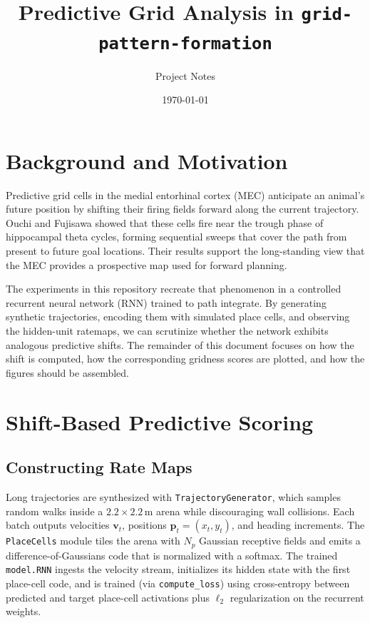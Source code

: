 \documentclass[11pt]{article}
\title{Predictive Grid Analysis in \texttt{grid-pattern-formation}}
\author{Project Notes}
\date{\today}
\begin{document}
\maketitle

\section{Background and Motivation}
Predictive grid cells in the medial entorhinal cortex (MEC) anticipate an animal's future position by shifting their firing fields forward along the current trajectory. Ouchi and Fujisawa \cite{Ouchi2024} showed that these cells fire near the trough phase of hippocampal theta cycles, forming sequential sweeps that cover the path from present to future goal locations. Their results support the long-standing view that the MEC provides a prospective map used for forward planning.

The experiments in this repository recreate that phenomenon in a controlled recurrent neural network (RNN) trained to path integrate. By generating synthetic trajectories, encoding them with simulated place cells, and observing the hidden-unit ratemaps, we can scrutinize whether the network exhibits analogous predictive shifts. The remainder of this document focuses on how the shift is computed, how the corresponding gridness scores are plotted, and how the figures should be assembled.

\section{Shift-Based Predictive Scoring}
\subsection{Constructing Rate Maps}
Long trajectories are synthesized with \texttt{TrajectoryGenerator}, which samples random walks inside a $2.2\times 2.2$\,m arena while discouraging wall collisions. Each batch outputs velocities $\mathbf{v}_t$, positions $\mathbf{p}_t=(x_t, y_t)$, and heading increments. The \texttt{PlaceCells} module tiles the arena with $N_p$ Gaussian receptive fields and emits a difference-of-Gaussians code that is normalized with a softmax. The trained \texttt{model.RNN} ingests the velocity stream, initializes its hidden state with the first place-cell code, and is trained (via \texttt{compute\_loss}) using cross-entropy between predicted and target place-cell activations plus $\ell_2$ regularization on the recurrent weights.
\end{document}
